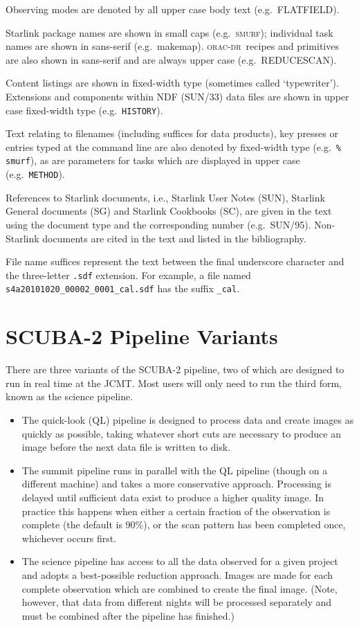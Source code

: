 \documentclass[twoside,11pt]{article}
\newcommand{\xref}[3]{#1}
\newcommand{\xlabel}[1]{}
\renewcommand{\_}{\texttt{\symbol{95}}}
\newcommand{\SMURF}{\textsc{smurf}}
\newcommand{\ndfref}{\xref{SUN/33}{sun33}{}}
\newcommand{\oracdr}{\textsc{orac-dr}}
\newcommand{\task}[1]{\textsf{#1}}
\newcommand{\makemap}{\xref{\task{makemap}}{sun258}{MAKEMAP}}
\newcommand{\aparam}[1]{\texttt{#1}}     %
\newcommand{\ndfcomp}[1]{\texttt{#1}}    %
\begin{document}
Observing modes are denoted by all upper case body text (e.g.\
FLATFIELD).

Starlink package names are shown in small caps (e.g.\ \SMURF);
individual task names are shown in sans-serif
(e.g.\ \makemap). \oracdr\ recipes and primitives are also shown in
sans-serif and are always upper case (e.g.\ \task{REDUCE\_SCAN}).

Content listings are shown in fixed-width type (sometimes called
`typewriter'). Extensions and components within NDF (\ndfref) data
files are shown in upper case fixed-width type (e.g.\
\ndfcomp{HISTORY}).

Text relating to filenames (including suffices for data products), key
presses or entries typed at the command line are also denoted by
fixed-width type (e.g.\ \texttt{\% smurf}), as are parameters for
tasks which are displayed in upper case (e.g.\ \aparam{METHOD}).

References to Starlink documents, i.e., Starlink User Notes (SUN),
Starlink General documents (SG) and Starlink Cookbooks (SC), are given
in the text using the document type and the corresponding number
(e.g.\ SUN/95). Non-Starlink documents are cited in the text and
listed in the bibliography.

File name suffices represent the text between the final underscore
character and the three-letter \verb+.sdf+ extension. For example, a
file named \verb+s4a20101020_00002_0001_cal.sdf+ has the suffix
\verb+_cal+.

\section{\xlabel{pipelines}SCUBA-2 Pipeline Variants\label{se:pipelines}}

There are three variants of the SCUBA-2 pipeline, two of which are
designed to run in real time at the JCMT. Most users will only need to
run the third form, known as the science pipeline.

\begin{itemize}
\item The quick-look (QL) pipeline is designed to process data and
  create images as quickly as possible, taking whatever short cuts are
  necessary to produce an image before the next data file is written
  to disk.

\item The summit pipeline runs in parallel with the QL pipeline
  (though on a different machine) and takes a more conservative
  approach. Processing is delayed until sufficient data exist to
  produce a higher quality image. In practice this happens when either
  a certain fraction of the observation is complete (the default is
  90\%), or the scan pattern has been completed once, whichever occurs
  first.

\item The science pipeline has access to all the data observed for a
  given project and adopts a best-possible reduction approach. Images
  are made for each complete observation which are combined to create
  the final image. (Note, however, that data from different nights
  will be processed separately and must be combined after the pipeline
  has finished.)
\end{itemize}
\end{document}
